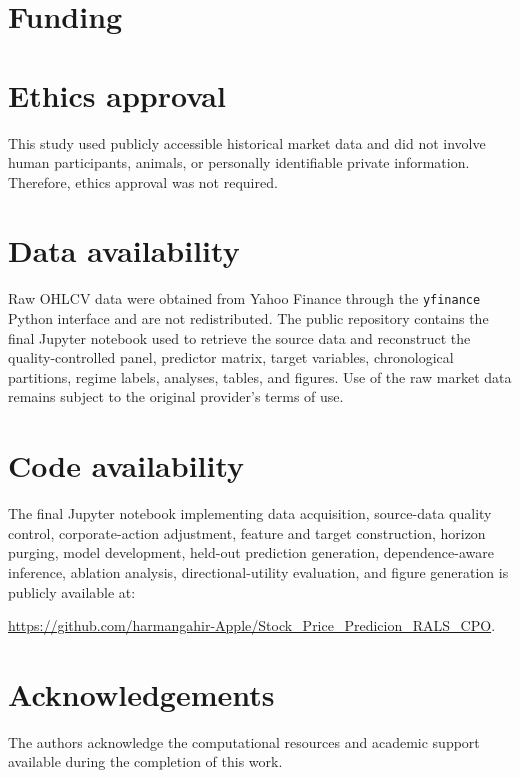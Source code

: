 \documentclass[fleqn,10pt]{wlscirep}
\begin{document}
\section*{Funding}


\section*{Ethics approval}
This study used publicly accessible historical market data and did not involve human participants, animals, or personally identifiable private information. Therefore, ethics approval was not required.

\section*{Data availability}

Raw OHLCV data were obtained from Yahoo Finance through the \texttt{yfinance} Python interface and are not redistributed. The public repository contains the final Jupyter notebook used to retrieve the source data and reconstruct the quality-controlled panel, predictor matrix, target variables, chronological partitions, regime labels, analyses, tables, and figures. Use of the raw market data remains subject to the original provider's terms of use.

\section*{Code availability}

The final Jupyter notebook implementing data acquisition, source-data quality control, corporate-action adjustment, feature and target construction, horizon purging, model development, held-out prediction generation, dependence-aware inference, ablation analysis, directional-utility evaluation, and figure generation is publicly available at:

\url{https://github.com/harmangahir-Apple/Stock_Price_Predicion_RALS_CPO}.

\section*{Acknowledgements}

The authors acknowledge the computational resources and academic support available during the completion of this work.
\end{document}
